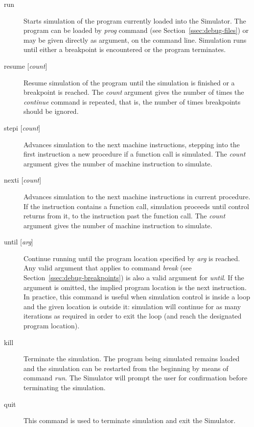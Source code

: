 \documentclass[twoside]{tceusermanual}
\begin{document}
\begin{description}
\item[run] %
  Starts simulation of the program currently loaded into the Simulator.  The
  program can be loaded by \emph{prog} command (see
  Section~\ref{ssec:debug-files}) or may be given directly as argument, on
  the command line.  Simulation runs until either a breakpoint is
  encountered or the program terminates.

\item[resume {[\emph{count}]}] %
  Resume simulation of the program until the simulation is finished or a
  breakpoint is reached.  The \emph{count} argument gives the
  number of times the \emph{continue} command is repeated, that is, the
  number of times breakpoints should be ignored.

\item[stepi {[\emph{count}]}] %
  Advances simulation to the next machine instructions, stepping into the
  first instruction a new procedure if a function call is simulated.  The
  \emph{count} argument gives the number of machine instruction to simulate.

\item[nexti {[\emph{count}]}] %
  Advances simulation to the next machine instructions in current procedure.
  If the instruction contains a function call, simulation proceeds until
  control returns from it, to the instruction past the function call.  The
  \emph{count} argument gives the number of machine instruction to simulate.

\item[until {[\emph{arg}]}] %
  Continue running until the program location specified by \emph{arg} is
  reached.  Any valid argument that applies to command \emph{break} (see
  Section~\ref{ssec:debug-breakpoints}) is also a valid argument for
  \emph{until}.  If the argument is omitted, the implied program location
  is the next instruction.  In practice, this command is useful when
  simulation control is inside a loop and the given location is outside it:
  simulation will continue for as many iterations as required in order to
  exit the loop (and reach the designated program location).

\item[kill] %
  Terminate the simulation.  The program being simulated remains loaded and
  the simulation can be restarted from the beginning by means of command
  \emph{run}.  The Simulator will prompt the user for confirmation
  before terminating the simulation.

\item[quit] %
  This command is used to terminate simulation and exit the Simulator.
\end{description}
\end{document}
